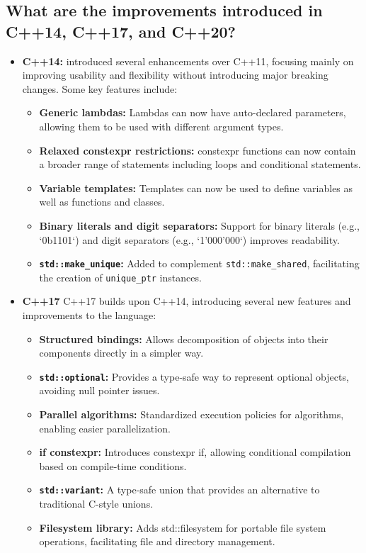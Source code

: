 \subsection{What are the improvements introduced in C++14, C++17, and C++20?}
\begin{itemize}
\item \textbf{C++14:} introduced several enhancements over C++11, focusing mainly on improving usability and flexibility without introducing major breaking changes. Some key features include:
\begin{itemize}
    \item \textbf{Generic lambdas:} Lambdas can now have auto-declared parameters, allowing them to be used with different argument types.
    \item \textbf{Relaxed constexpr restrictions:} constexpr functions can now contain a broader range of statements including loops and conditional statements.
    \item \textbf{Variable templates:} Templates can now be used to define variables as well as functions and classes.
    \item \textbf{Binary literals and digit separators:} Support for binary literals (e.g., `0b1101`) and digit separators (e.g., `1'000'000`) improves readability.
    \item \textbf{\texttt{std::make\_unique}:} Added to complement \texttt{std::make\_shared}, facilitating the creation of \texttt{unique\_ptr} instances.
\end{itemize}

\item \textbf{C++17}
C++17 builds upon C++14, introducing several new features and improvements to the language:

\begin{itemize}
    \item \textbf{Structured bindings:} Allows decomposition of objects into their components directly in a simpler way.
    \item \textbf{\texttt{std::optional}:} Provides a type-safe way to represent optional objects, avoiding null pointer issues.
    \item \textbf{Parallel algorithms:} Standardized execution policies for algorithms, enabling easier parallelization.
    \item \textbf{if constexpr:} Introduces constexpr if, allowing conditional compilation based on compile-time conditions.
    \item \textbf{\texttt{std::variant}:} A type-safe union that provides an alternative to traditional C-style unions.
    \item \textbf{Filesystem library:} Adds std::filesystem for portable file system operations, facilitating file and directory management.
\end{itemize}


\end{itemize}
